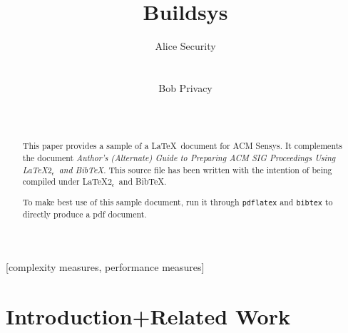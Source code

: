 \documentclass[10pt]{sensys-proc}
\author{
%
\alignauthor Alice Security \\
        \affaddr{Department of Computer Science}\\
        \affaddr{University of Southern California}\\
       \email{alice@example.edu}
\alignauthor Bob Privacy \\
    \affaddr{Networked Embedded Systems Group}\\
    \affaddr{Swedish Institute of Computer Science}\\
    \email{bob@example.se}
}
\title{Buildsys}
\begin{document}
\maketitle

\begin{abstract}
This paper provides a sample of a \LaTeX\ document for ACM Sensys. 
It complements the document \textit{Author's (Alternate) Guide to
Preparing ACM SIG Proceedings Using \LaTeX$2_\epsilon$\ and Bib\TeX}.
This source file has been written with the intention of being
compiled under \LaTeX$2_\epsilon$\ and BibTeX.

To make best use of this sample document, run it through \texttt{pdflatex}
and \texttt{bibtex} to directly produce a pdf document.
\end{abstract}

[complexity measures, performance measures]



\section{Introduction+Related Work}
  \label{sec:intro}
\end{document}
